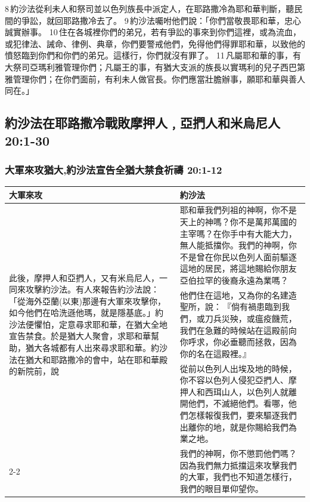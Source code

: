 8 約沙法從利未人和祭司並以色列族長中派定人，在耶路撒冷為耶和華判斷，聽民間的爭訟，就回耶路撒冷去了。 9 約沙法囑咐他們說：「你們當敬畏耶和華，忠心誠實辦事。 10 住在各城裡你們的弟兄，若有爭訟的事來到你們這裡，或為流血，或犯律法、誡命、律例、典章，你們要警戒他們，免得他們得罪耶和華，以致他的憤怒臨到你們和你們的弟兄。這樣行，你們就沒有罪了。 11 凡屬耶和華的事，有大祭司亞瑪利雅管理你們；凡屬王的事，有猶大支派的族長以實瑪利的兒子西巴第雅管理你們；在你們面前，有利未人做官長。你們應當壯膽辦事，願耶和華與善人同在。」


\subsection{約沙法在耶路撒冷戰敗摩押人﹐亞捫人和米烏尼人 20:1-30}
\subsubsection{大軍來攻猶大,約沙法宣告全猶大禁食祈禱 20:1-12}
\begin{table}[H]
\centering 
\begin{tabular}{p{5.050cm}|p{12.25cm}}\hline\hline
大軍來攻&約沙法\\\hline\hline
\multirow{3}{5.16cm}{此後，摩押人和亞捫人，又有米烏尼人，一同來攻擊約沙法。有人來報告約沙法說：「從海外亞蘭(以東)那邊有大軍來攻擊你，如今他們在哈洗遜他瑪，就是隱基底。」約沙法便懼怕，定意尋求耶和華，在猶大全地宣告禁食。於是猶大人聚會，求耶和華幫助，猶大各城都有人出來尋求耶和華。約沙法在猶大和耶路撒冷的會中，站在耶和華殿的新院前，說}
&耶和華我們列祖的神啊，你不是天上的神嗎？你不是萬邦萬國的主宰嗎？在你手中有大能大力，無人能抵擋你。我們的神啊，你不是曾在你民以色列人面前驅逐這地的居民，將這地賜給你朋友亞伯拉罕的後裔永遠為業嗎？\\\cline{2-2}

&他們住在這地，又為你的名建造聖所，說： 『倘有禍患臨到我們，或刀兵災殃，或瘟疫饑荒，我們在急難的時候站在這殿前向你呼求，你必垂聽而拯救，因為你的名在這殿裡。』\\\cline{2-2} 
&從前以色列人出埃及地的時候，你不容以色列人侵犯亞捫人、摩押人和西珥山人，以色列人就離開他們，不滅絕他們。看哪，他們怎樣報復我們，要來驅逐我們出離你的地，就是你賜給我們為業之地。\\\cline{2-2}
&我們的神啊，你不懲罰他們嗎？因為我們無力抵擋這來攻擊我們的大軍，我們也不知道怎樣行，我們的眼目單仰望你。\\\hline
\end{tabular}
\end{table}



